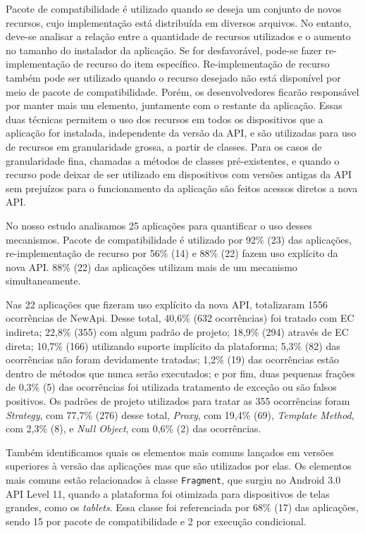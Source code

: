 Pacote de compatibilidade é utilizado quando se deseja um conjunto de novos recursos,
cujo implementação está distribuída em diversos arquivos. No entanto, deve-se analisar
a relação entre a quantidade de recursos utilizados e o aumento no tamanho do instalador
da aplicação. Se for desfavorável, pode-se fazer re-implementação de recurso do item específico. Re-implementação de recurso também pode ser utilizado quando o recurso desejado
não está disponível por meio de pacote de compatibilidade. Porém, os desenvolvedores ficarão 
responsável por manter mais um elemento, juntamente com o restante da aplicação. Essas duas 
técnicas permitem o uso dos recursos em todos os dispositivos que a aplicação for instalada, 
independente da versão da API, e são utilizadas para uso de recursos em granularidade grossa,
a partir de classes. Para os casos de granularidade fina, chamadas a métodos de classes 
pré-existentes, e quando o recurso pode deixar de ser utilizado em dispositivos com versões 
antigas da API sem prejuízos para o funcionamento da aplicação são feitos acessos diretos a 
nova API.

No nosso estudo analisamos 25 aplicações para quantificar o uso desses mecanismos.
Pacote de compatibilidade é utilizado por 92\% (23) das aplicações, re-implementação
de recurso por 56\% (14) e 88\% (22) fazem uso explícito da nova API. 88\% (22) das
aplicações utilizam mais de um mecanismo simultaneamente. 

Nas 22 aplicações que fizeram uso explícito da nova API, totalizaram 1556 ocorrências
de NewApi. Desse total, 40,6\% (632 ocorrências) foi tratado com EC indireta; 22,8\%
(355) com algum padrão de projeto; 18,9\% (294) através de EC direta; 10,7\% (166)
utilizando suporte implícito da plataforma; 5,3\% (82) das ocorrências não foram devidamente 
tratadas; 1,2\% (19) das ocorrências estão dentro de métodos que nunca serão executados;
e por fim, duas pequenas frações de 0,3\% (5) das ocorrências foi utilizada tratamento
de exceção ou são falsos positivos. Os padrões de projeto utilizados para tratar as 355
ocorrências foram \textit{Strategy}, com 77,7\% (276) desse total, \textit{Proxy}, 
com 19,4\% (69), \textit{Template Method}, com 2,3\% (8), e \textit{Null Object},
com 0,6\% (2) das ocorrências. 

Também identificamos quais os elementos mais comuns lançados em versões superiores
à versão das aplicações mas que são utilizados por elas. Os elementos mais comuns
estão relacionados à classe \texttt{Fragment}, que surgiu no Android 3.0 API Level
11, quando a plataforma foi otimizada para dispositivos de telas grandes, como os
\textit{tablets}. Essa classe foi referenciada por 68\% (17) das aplicações, sendo
15 por pacote de compatibilidade e 2 por execução condicional.

